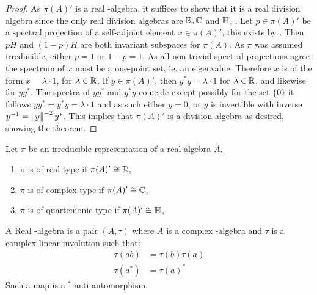 \begin{proof}
	As $\pi(A)'$ is a real \Cstar-algebra, it suffices to show that it is a real division algebra since the only real division algebras are $\mathbb{R},\mathbb{C}$ and $\mathbb{H}$, \cite{divisionalgebra}. 
	Let $p\in \pi(A)'$ be a spectral projection of a self-adjoint element $x\in \pi(A)'$, this exists by \cite[Remark 20.18]{meise}. Then $pH$ and $(1-p)H$ are both invariant subspaces for $\pi(A)$. As $\pi$ was assumed irreducible, either $p=1$ or $1-p=1$. As all non-trivial spectral projections agree the spectrum of $x$ must be a one-point set, ie. an eigenvalue. Therefore $x$ is of the form $x=\lambda \cdot 1$, for $\lambda \in \mathbb{R}$. If $y\in \pi(A)'$, then $y^*y=\lambda \cdot 1$ for $\lambda \in \mathbb{R}$, and likewise for $yy^*$. The spectra of $yy^*$ and $y^*y$ coincide except possibly for the set $\{0\}$ it follows $yy^*=y^*y=\lambda \cdot 1$ and as such either $y=0$, or $y$ is invertible with inverse $y^{-1}=\left \Vert y \right \Vert^{-2}y^*$. This implies that $\pi(A)'$ is a division algebra as desired, showing the theorem. 
\end{proof}
\begin{definition}
	Let $\pi$ be an irreducible representation of a real \Cstar algebra $A$. 
\begin{enumerate}
\item
	$\pi$ is of real type if $\pi(A)'\cong \mathbb{R}$, 
\item
	$\pi$ is of complex type if $\pi(A)'\cong \mathbb{C}$, 
\item
	$\pi$ is of quartenionic type if $\pi(A)'\cong \mathbb{H}$, 
\end{enumerate}	
\end{definition}
\begin{definition}
	A Real \Cstar-algebra is a pair $(A,\tau)$ where $A$ is a complex \Cstar-algebra and $\tau$ is a complex-linear involution such that:
	\begin{align*}
		\tau(ab)&=\tau(b)\tau(a) \\
		\tau(a^*)&=\tau(a)^*
	\end{align*}
	Such a map is a $^*$-anti-automorphism. 
\end{definition}
